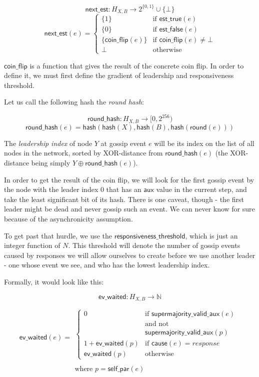 \documentclass[a4paper,fleqn]{article}
\begin{document}
\[ \mathsf{next\_est}: H_{X,B} \to 2^{\{0,1\}} \cup \{ \bot \} \]
\[ \mathsf{next\_est}(e) = \left\{ \begin{array}{ll}
	\{1\} & \textrm{if $\mathsf{est\_true}(e)$} \\
	\{0\} & \textrm{if $\mathsf{est\_false}(e)$} \\
	\{\mathsf{coin\_flip}(e)\} & \textrm{if $\mathsf{coin\_flip}(e) \neq \bot$} \\
	\bot & \textrm{otherwise}
\end{array} \right. \]

$\mathsf{coin\_flip}$ is a function that gives the result of the concrete coin flip. In order to
define it, we must first define the gradient of leadership and responsiveness threshold.

Let us call the following hash the \emph{round hash}:

\[ \mathsf{round\_hash}: H_{X,B} \to [0, 2^{256}) \]
\[ \mathsf{round\_hash}(e) = \mathsf{hash}( \mathsf{hash}(X), \mathsf{hash}(B),
	\mathsf{hash}(\mathsf{round}(e))) \]

The \emph{leadership index} of node $Y$ at gossip event $e$ will be its index on the list of all
nodes in the network, sorted by XOR-distance from $\mathsf{round\_hash}(e)$ (the XOR-distance being
simply $Y \oplus \mathsf{round\_hash}(e)$).

In order to get the result of the coin flip, we will look for the first gossip event by the node
with the leader index 0 that has an $\mathsf{aux}$ value in the current step, and take the least
significant bit of its hash. There is one caveat, though - the first leader might be dead and never
gossip such an event. We can never know for sure because of the asynchronicity assumption.

To get past that hurdle, we use the $\mathsf{responsiveness\_threshold}$, which is just an integer
function of $N$. This threshold will denote the number of gossip events caused by responses we will
allow ourselves to create before we use another leader - one whose event we see, and who has the
lowest leadership index.

Formally, it would look like this:

\[ \mathsf{ev\_waited}: H_{X,B} \to \mathbb{N} \]
\[ \mathsf{ev\_waited}(e) = \begin{array}{l}
	\\
	\\
	\left\{ \begin{array}{ll}
		0 & \textrm{if $\mathsf{supermajority\_valid\_aux}(e)$} \\
		& \textrm{and not} \\
		& \mathsf{supermajority\_valid\_aux}(p) \\
		1 + \mathsf{ev\_waited}(p) & \textrm{if $\mathsf{cause}(e) = response$} \\
		\mathsf{ev\_waited}(p) & \textrm{otherwise}
	\end{array}\right. \\
	\\
	\textrm{where $p = \mathsf{self\_par}(e)$}
\end{array}\]
\end{document}
